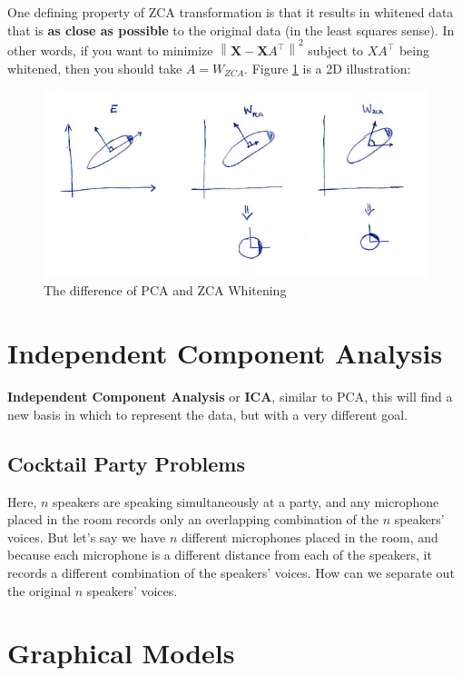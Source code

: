 \documentclass[a3paper, 12pt]{book} %
\begin{document}
One defining property of ZCA transformation is that it results in whitened data that is \textbf{as close as possible} to the original data (in the least squares sense). In other words, if you want to minimize $\left\lVert \mathbf{X}-\mathbf{X}A^\top \right\rVert^2$ subject to $XA^\top$ being whitened, then you should take $A=W_{ZCA}$. Figure \ref{fig:zca_pca} is a 2D illustration:

\begin{figure}[htpb]
	\centering
	\includegraphics[width=\linewidth]{figures/zca.jpg}
	\caption{The difference of PCA and ZCA Whitening}
	\label{fig:zca_pca}
\end{figure}


\chapter{Independent Component Analysis}
\textbf{Independent Component Analysis} or \textbf{ICA}, similar to PCA, this will find a new basis in which to represent the data, but with a very different goal.

\section{Cocktail Party Problems}
Here, $n$ speakers are speaking simultaneously at a party, and any microphone placed in the room records only an overlapping combination of the $n$ speakers' voices. But let's say we have $n$ different microphones placed in the room, and because each microphone is a different distance from each of the speakers, it records a different combination of the speakers' voices. How can we separate out the original $n$ speakers' voices.


\chapter{Graphical Models}
\end{document}
